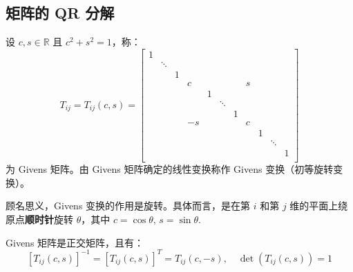 \subsection{矩阵的 QR 分解}
\label{sec:qr}

\begin{definition}
设 $c,s\in\mathbb R$ 且 $c^2+s^2=1$，称：
\[
    T_{ij}=T_{ij}(c,s)=
    \begin{bmatrix}
    1&      & &  & &      & & & &      & \\
     &\ddots& &  & &      & & & &      & \\
     &      &1&  & &      & & & &      & \\
     &      & &c & &      & &s& &      & \\
     &      & &  &1&      & & & &      & \\
     &      & &  & &\ddots& & & &      & \\
     &      & &  & &      &1& & &      & \\
     &      & &-s& &      & &c& &      & \\
     &      & &  & &      & & &1&      & \\
     &      & &  & &      & & & &\ddots& \\
     &      & &  & &      & & & &      &1\\
    \end{bmatrix}
\]
为 Givens 矩阵。由 Givens 矩阵确定的线性变换称作 Givens 变换（初等旋转变换）。
\end{definition}

\begin{remark}
顾名思义，Givens 变换的作用是旋转。具体而言，是在第 $i$ 和第 $j$ 维的平面上绕原点\textbf{顺时针}旋转 $\theta$，其中 $c=\cos\theta,\,s=\sin\theta$.
\end{remark}

\begin{property}
Givens 矩阵是正交矩阵，且有：
\[
    [T_{ij}(c,s)]^{-1}=[T_{ij}(c,s)]^T=T_{ij}(c,-s),\quad\det(T_{ij}(c,s))=1
\]
\end{property}

